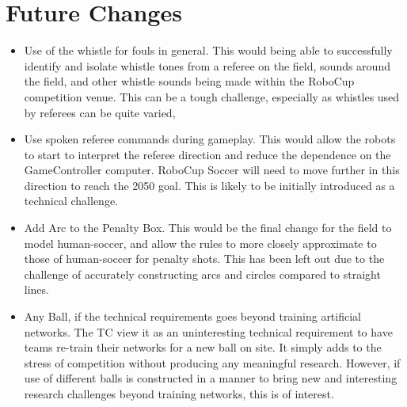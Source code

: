 \section{Future Changes}
\label{sec:future_changes}
\begin{itemize}
  \item Use of the whistle for fouls in general. This would being able to successfully identify and isolate whistle tones from a referee on the field, sounds around the field, and other whistle sounds being made within the RoboCup competition venue. This can be a tough challenge, especially as whistles used by referees can be quite varied,
  \item Use spoken referee commands during gameplay. This would allow the robots to start to interpret the referee direction and reduce the dependence on the GameController computer. RoboCup Soccer will need to move further in this direction to reach the 2050 goal. This is likely to be initially introduced as a technical challenge.
  \item Add Arc to the Penalty Box. This would be the final change for the field to model human-soccer, and allow the rules to more closely approximate to those of human-soccer for penalty shots. This has been left out due to the challenge of accurately constructing arcs and circles compared to straight lines.
  \item Any Ball, if the technical requirements goes beyond training artificial networks. The TC view it as an uninteresting technical requirement to have teams re-train their networks for a new ball on site. It simply adds to the stress of competition without producing any meaningful research. However, if use of different balls is constructed in a manner to bring new and interesting research challenges beyond training networks, this is of interest.
\end{itemize}
